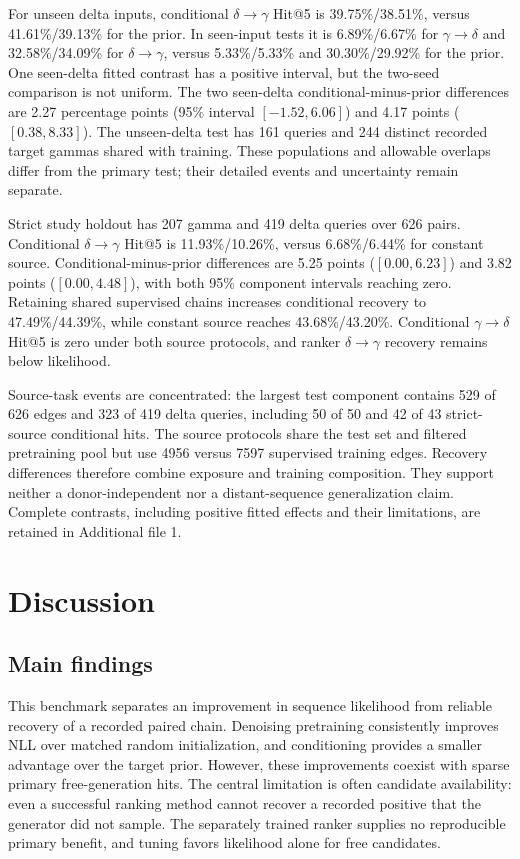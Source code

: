 \documentclass[a4paper,11pt]{article}
\newcommand{\gtd}{\mbox{\ensuremath{\gamma\!\rightarrow\!\delta}}}
\newcommand{\dtg}{\mbox{\ensuremath{\delta\!\rightarrow\!\gamma}}}
\begin{document}
For unseen delta inputs, conditional \dtg{} Hit@5 is 39.75\%/38.51\%,
versus 41.61\%/39.13\% for the prior. In seen-input tests it is
6.89\%/6.67\% for \gtd{} and 32.58\%/34.09\% for \dtg{}, versus
5.33\%/5.33\% and 30.30\%/29.92\% for the prior.
One seen-delta fitted contrast has a positive interval, but the two-seed
comparison is not uniform. The two seen-delta conditional-minus-prior
differences are 2.27 percentage points (95\% interval $[-1.52,6.06]$) and
4.17 points ($[0.38,8.33]$). The unseen-delta test has 161 queries and 244
distinct recorded target gammas shared with training. These populations and allowable overlaps differ
from the primary test; their detailed events and uncertainty remain separate.

Strict study holdout has 207 gamma and 419 delta queries over 626 pairs.
Conditional \dtg{} Hit@5 is 11.93\%/10.26\%, versus 6.68\%/6.44\% for
constant source. Conditional-minus-prior differences are 5.25 points
($[0.00,6.23]$) and 3.82 points ($[0.00,4.48]$), with both 95\% component
intervals reaching zero. Retaining shared supervised chains increases
conditional recovery to 47.49\%/44.39\%, while constant source reaches
43.68\%/43.20\%. Conditional \gtd{} Hit@5 is zero under both source
protocols, and ranker \dtg{} recovery remains below likelihood.

Source-task events are concentrated: the largest test component contains
529 of 626 edges and 323 of 419 delta queries, including 50 of 50 and 42
of 43 strict-source conditional hits. The source protocols share the test set
and filtered pretraining pool but use 4956 versus 7597 supervised training
edges. Recovery differences therefore combine exposure and training
composition. They support neither a donor-independent nor a distant-sequence
generalization claim. Complete contrasts, including positive fitted effects
and their limitations, are retained in Additional file 1.

\section{Discussion}
\subsection{Main findings}
This benchmark separates an improvement in sequence likelihood from reliable
recovery of a recorded paired chain. Denoising pretraining consistently
improves NLL over matched random initialization, and conditioning provides a
smaller advantage over the target prior. However, these improvements coexist
with sparse primary free-generation hits. The central limitation is often
candidate availability: even a successful ranking method cannot recover a
recorded positive that the generator did not sample. The separately trained
ranker supplies no reproducible primary benefit, and tuning favors likelihood
alone for free candidates.
\end{document}
